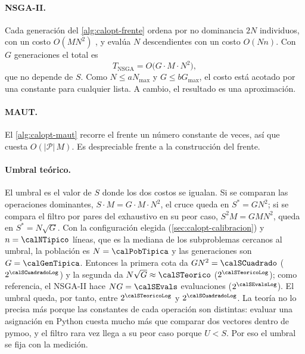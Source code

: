 \paragraph{NSGA-II.} Cada generación del \cref{alg:calopt-frente} ordena por no
dominancia $2N$ individuos, con un costo $O(MN^2)$ \cite{deb_fast_2002}, y
evalúa $N$ descendientes con un costo $O(Nn)$. Con $G$ generaciones el total es
\[
  T_{\mathrm{NSGA}}=O\bigl(G\cdot M\cdot N^2\bigr),
\]
que no depende de $S$. Como $N\leq a N_{\max}$ y $G\leq b G_{\max}$, el costo
está acotado por una constante para cualquier lista. A cambio, el resultado es
una aproximación.

\paragraph{MAUT.} El \cref{alg:calopt-maut} recorre el frente un número
constante de veces, así que cuesta $O(|\mathcal{P}|\,M)$. Es despreciable frente
a la construcción del frente.

\paragraph{Umbral teórico.} El umbral es el valor de $S$ donde los dos costos
se igualan. Si se comparan las operaciones dominantes,
$S\cdot M=G\cdot M\cdot N^2$, el cruce queda en $S^{\ast}=G N^2$; si se compara
el filtro por pares del exhaustivo en su peor caso, $S^2M=GMN^2$, queda en
$S^{\ast}=N\sqrt{G}$. Con la configuración elegida
(\cref{sec:calopt-calibracion}) y $n=\calNTipico$ líneas, que es la mediana
de los subproblemas cercanos al umbral, la población es $N=\calPobTipica$ y
las generaciones son $G=\calGenTipica$. Entonces la primera cota da
$GN^2=\calSCuadrado$ ($2^{\calSCuadradoLog}$) y la segunda da
$N\sqrt{G}\approx\calSTeorico$ ($2^{\calSTeoricoLog}$); como referencia, el
NSGA-II hace $NG=\calSEvals$ evaluaciones ($2^{\calSEvalsLog}$). El umbral
queda, por tanto, entre $2^{\calSTeoricoLog}$ y $2^{\calSCuadradoLog}$. La
teoría no lo precisa más porque las constantes de cada operación son
distintas: evaluar una asignación en Python cuesta mucho más que comparar dos
vectores dentro de pymoo, y el filtro rara vez llega a su peor caso porque
$U<S$. Por eso el umbral se fija con la medición.

